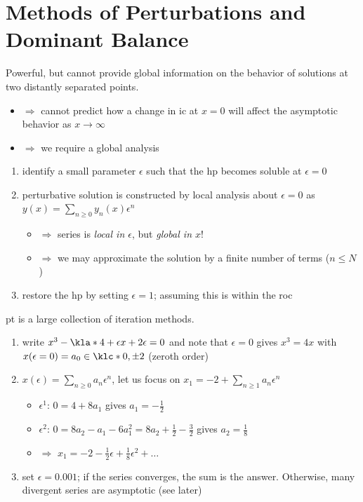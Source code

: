 \documentclass[english, parskip=full]{scrbook}
\newcommand{\definition}[2]{\begin{tcolorbox}[colback=colorbackgrounddefinition,colframe=colordefinition, breakable,enhanced,title=\textbf{#1}.]#2\end{tcolorbox}}
\newcommand{\note}[1]{\begin{tcolorbox}[colback=colorbackgroundnote,colframe=colornote, breakable,enhanced]#1\end{tcolorbox}}
\newcommand{\example}[3]{\begin{tcolorbox}[colback=colorbackgroundexample,colframe=colorexample, breakable,enhanced,title={\textbf{#1}: #2.}]#3\end{tcolorbox}}
\begin{document}
\section{Methods of Perturbations and Dominant Balance}
\definition{Local Analysis}{Powerful, but cannot provide global information on the behavior of solutions at two distantly separated points.
\begin{itemize}
\item $\Rightarrow$ cannot predict how a change in \gls{ic} at $x=0$ will affect the asymptotic behavior as $x\rightarrow\infty$
\item $\Rightarrow$ we require a global analysis
\end{itemize}}
\definition{\gls{pt}}{\begin{enumerate}
\item identify a small parameter $\epsilon$ such that the \gls{hp} becomes soluble at $\epsilon=0$
\item perturbative solution is constructed by local analysis about $\epsilon=0$ as $y(x) = \sum_{n\ge 0} y_n(x) \epsilon^n$
\begin{itemize}
\item $\Rightarrow$ series is \emph{local in $\epsilon$}, but \emph{global in $x$}!
\item $\Rightarrow$ we may approximate the solution by a finite number of terms ($n\le N$)
\end{itemize}
\item restore the \gls{hp} by setting $\epsilon=1$; assuming this is within the \gls{roc}
\end{enumerate}}
\note{\gls{pt} is a large collection of iteration methods.}
\example{Cubic Equation}{$x^3 - 4.001x + 0.002 = 0$}{\begin{enumerate}
\item write $x^3 - \kla*{4+\epsilon}x + 2\epsilon=0$ and note that $\epsilon=0$ gives $x^3=4x$ with $x(\epsilon=0) = a_0 \in \klc*{0,\pm 2}$ (zeroth order)
\item $x(\epsilon) = \sum_{n\ge 0} a_n \epsilon^n$, let us focus on $x_1 = -2 + \sum_{n\ge 1} a_n \epsilon^n$
\begin{itemize}
\item $\epsilon^1$: $0 = 4 + 8a_1$ gives $a_1 = -\frac{1}{2}$
\item $\epsilon^2$: $0 = 8a_2 - a_1 - 6a_1^2 = 8a_2 + \frac{1}{2} - \frac{3}{2}$ gives $a_2 = \frac{1}{8}$
\item $\Rightarrow$ $x_1 = -2 - \frac{1}{2}\epsilon + \frac{1}{8} \epsilon^2 + \dots$
\end{itemize}
\item set $\epsilon=0.001$; if the series converges, the sum is the answer. Otherwise, many divergent series are asymptotic (see later)
\end{enumerate}
}
\end{document}
